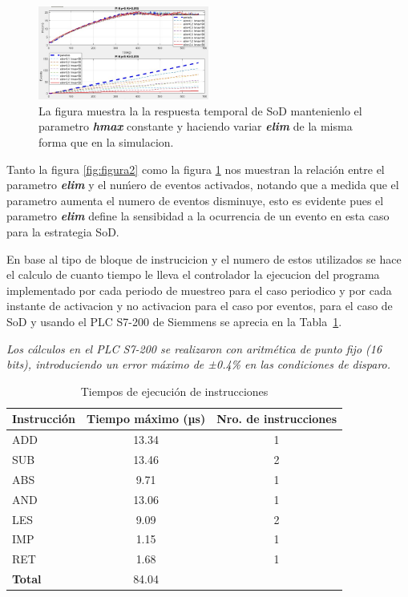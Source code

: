 \documentclass[conference]{IEEEtran}
\begin{document}
\begin{figure}[h]
    \centering
    \includegraphics[width=0.5\textwidth]{sodfisico}
    \caption{La figura muestra la la respuesta temporal de SoD mantenienlo el parametro \textbf{\textit{hmax}} constante y haciendo variar \textbf{\textit{elim}} de la misma forma que en la simulacion.}
    \label{fig:figura4}
\end{figure}

Tanto la figura \ref{fig:figura2} como la figura \ref{fig:figura4} nos muestran la relaci\'on entre el parametro \textbf{\textit{elim}} y el nu\'mero de eventos activados, notando que a medida que el parametro aumenta el numero de eventos disminuye, esto es evidente pues el parametro \textbf{\textit{elim}} define la sensibidad a la ocurrencia de un evento en esta caso para la estrategia SoD.

En base al tipo de bloque de instrucicion y el numero de estos utilizados se hace el calculo de cuanto tiempo le lleva el controlador la ejecucion del programa implementado por cada periodo de muestreo para el caso periodico y por cada instante de activacion y no activacion para el caso por eventos, para el caso de SoD y usando el PLC S7-200 de Siemmens se aprecia en la Tabla~\ref{tabla:tiempos}.

\textit{Los cálculos en el PLC S7-200 se realizaron con aritmética de punto fijo (16 bits), introduciendo un error máximo de ±0.4\% en las condiciones de disparo.}

\begin{table}[h]
    \centering
    \caption{Tiempos de ejecución de instrucciones}
    \begin{tabular}{|l|c|c|}
        \hline
        \textbf{Instrucción} & \textbf{Tiempo máximo (µs)} & \textbf{Nro. de instrucciones} \\
        \hline
        ADD    & 13.34    & 1    \\
        SUB    & 13.46    & 2    \\
        ABS    & 9.71     & 1    \\
        AND    & 13.06    & 1    \\
        LES    & 9.09     & 2    \\
        IMP    & 1.15     & 1    \\
        RET    & 1.68     & 1    \\
        \hline
        \textbf{Total} & 84.04    &    \\
        \hline
    \end{tabular}
    \label{tabla:tiempos}
\end{table}
\end{document}
